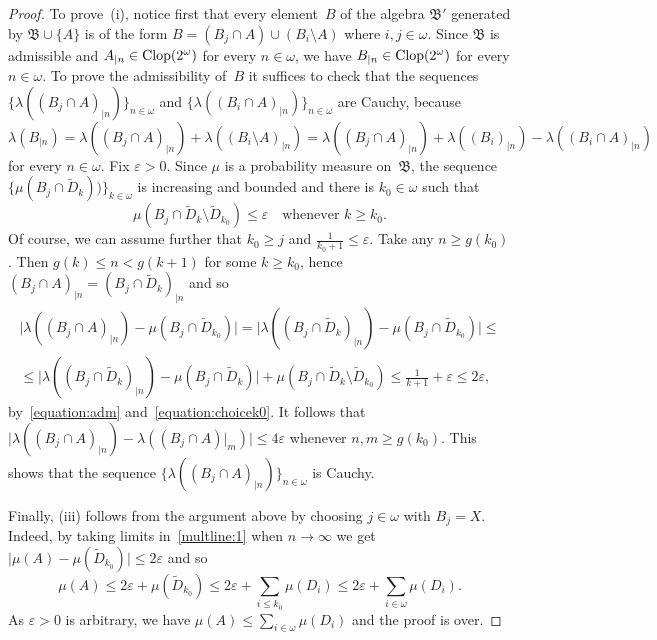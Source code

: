 \documentclass[12pt]{amsart}
\newcommand{\sm}{\setminus}
\newcommand\eps{\ensuremath{\varepsilon}}
\newcommand{\algb}{\mathfrak B}
\newcommand{\clop}{\protect{\rm Clop} }
\newcommand{\0}{\protect{\bf 0}}
\newcommand{\1}{\protect{\bf 1}}
\theoremstyle{definition}
\theoremstyle{remark}
\numberwithin{equation}{section}
\def\epsilon{\varepsilon}
\begin{document}
\begin{proof}
To prove~(i), notice first that every element~$B$ of the algebra $\algb'$
generated by $\algb\cup\{A\}$ is of the form
$B=(B_j\cap A) \cup (B_i\sm A)$ where $i,j\in \omega$. Since 
$\algb$ is admissible and $A_{|n}\in \clop(2^\omega)$ for every $n\in \omega$, 
we have $B_{|n}\in \clop(2^\omega)$ for every $n\in \omega$. 
To prove the admissibility of~$B$ it suffices to check that
the sequences $\big\{\lambda((B_{j}\cap A)_{|n})\big\}_{n\in \omega}$ and
$\big\{\lambda((B_{i}\cap A)_{|n})\big\}_{n\in \omega}$ are Cauchy, because
$$
	\lambda(B_{|n})=
	\lambda((B_{j}\cap A)_{|n})+
	\lambda((B_{i}\sm A)_{|n})=
	\lambda((B_{j}\cap A)_{|n})+
	\lambda((B_{i})_{|n})-
	\lambda((B_{i}\cap A)_{|n})
$$
for every $n\in \omega$. Fix $\eps>0$. Since $\mu$ is a probability measure on~$\algb$, 
the sequence $\big\{\mu(B_j\cap \tilde{D}_k))\big\}_{k\in \omega}$ is increasing and bounded and 
there is $k_0 \in \omega$ such that
\begin{equation}\label{equation:choicek0}
	\mu(B_j\cap \tilde{D}_k \sm \tilde{D}_{k_0})\leq \epsilon \quad
	\mbox{whenever } k\geq k_0.
\end{equation}
Of course, we can assume further that $k_0 \geq j$ and $\frac{1}{k_0+1} \leq \epsilon$.
Take any $n\ge g(k_0)$. Then $g(k)\le n < g(k+1)$ for some $k\geq k_0$, hence
$(B_{j}\cap A)_{|n}=(B_j \cap \tilde{D}_k)_{|n}$ and so
\begin{multline}\label{multline:1}
	\big|\lambda((B_{j}\cap A)_{|n})-\mu(B_j \cap \tilde{D}_{k_0})\big|=
	\big|\lambda((B_{j}\cap \tilde{D}_k)_{|n})-\mu(B_j \cap \tilde{D}_{k_0})\big| \leq \\
	\leq |\lambda((B_{j}\cap \tilde{D}_k)_{|n})-\mu(B_{j}\cap \tilde{D}_k)\big|+
	\mu(B_j \cap \tilde{D}_{k} \sm \tilde{D}_{k_0})
	\leq \frac{1}{k+1}+\epsilon \leq 2\epsilon,
\end{multline}
by~\eqref{equation:adm} and~\eqref{equation:choicek0}. It follows that
$\big|\lambda((B_{j}\cap A)_{|n})-\lambda((B_{j}\cap A)|_{m})\big|\leq 4\epsilon$
whenever $n,m\geq g(k_0)$. This shows that the sequence $\big\{\lambda((B_{j}\cap A)_{|n})\big\}_{n\in \omega}$ is Cauchy.

Finally, (iii) follows from the argument above by choosing $j\in \omega$ with $B_j=X$. Indeed, by taking limits
in~\eqref{multline:1} when $n\to \infty$ we get $\big|\mu(A)-\mu(\tilde{D}_{k_0})\big| \leq 2\epsilon$
and so 
$$
	\mu(A)\leq 2\epsilon + \mu(\tilde{D}_{k_0}) \leq 2\epsilon + \sum_{i\leq k_0}\mu(D_i)\leq 2\epsilon + \sum_{i\in \omega}\mu(D_i).
$$
As $\epsilon>0$ is arbitrary, we have $\mu(A)\leq \sum_{i\in \omega}\mu(D_i)$ and the proof is over.
\end{proof}
\end{document}
